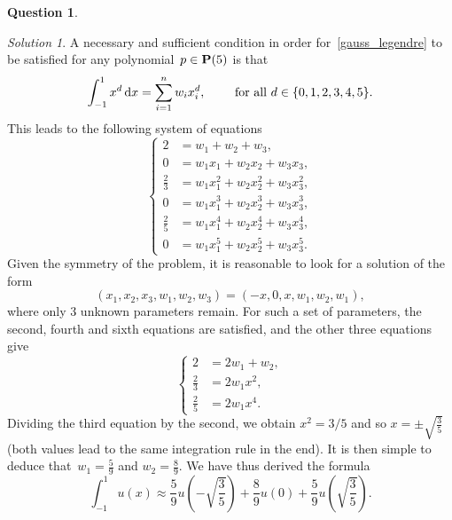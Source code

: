 \documentclass[11pt]{article}
\theoremstyle{definition}
\newtheorem{question}{Question}
\theoremstyle{remark}
\newtheorem*{solution}{Solution}
\begin{document}
\begin{question}
\begin{enumerate}
            \begin{solution}
                A necessary and sufficient condition in order for~\eqref{gauss_legendre} to be satisfied for any polynomial~$p \in \mathbf P(5)$ is that
                \[
                    \int_{-1}^{1} x^d \, \mathrm d x= \sum_{i=1}^{n} w_i x_i^d,
                    \qquad \text{ for all $d \in \{0, 1, 2, 3, 4, 5\}$}.
                \]
                This leads to the following system of equations
                \begin{equation*}
                    \left\{
                        \begin{aligned}
                            2 &= w_1 + w_2 + w_3, \\
                            0 &= w_1 x_1 + w_2 x_2 +  w_3 x_3, \\
                            \frac{2}{3} &= w_1 x_1^2 + w_2 x_2^2 +  w_3 x_3^2, \\
                            0 &= w_1 x_1^3 + w_2 x_2^3 +  w_3 x_3^3, \\
                            \frac{2}{5} &= w_1 x_1^4 + w_2 x_2^4 +  w_3 x_3^4, \\
                            0 &= w_1 x_1^5 + w_2 x_2^5 +  w_3 x_3^5.
                        \end{aligned}
                        \right.
                \end{equation*}
                Given the symmetry of the problem,
                it is reasonable to look for a solution of the form
                \[
                    (x_1, x_2, x_3, w_1, w_2, w_3)
                    = (-x, 0, x, w_1, w_2, w_1),
                \]
                where only 3 unknown parameters remain.
                For such a set of parameters,
                the second, fourth and sixth equations are satisfied,
                and the other three equations give
                \begin{equation*}
                    \left\{
                        \begin{aligned}
                            2 &= 2w_1 + w_2, \\
                            \frac{2}{3} &= 2 w_1 x^2, \\
                            \frac{2}{5} &= 2 w_1 x^4.
                        \end{aligned}
                        \right.
                \end{equation*}
                Dividing the third equation by the second,
                we obtain $x^2 = 3/5$ and so $x = \pm \sqrt{\frac{3}{5}}$ (both values lead to the same integration rule in the end).
                It is then simple to deduce that~$w_1 = \frac{5}{9}$ and $w_2 = \frac{8}{9}$.
                We have thus derived the formula
                \[
                    \int_{-1}^{1} u(x) \approx
                    \frac{5}{9} u \left( - \sqrt{\frac{3}{5}} \right)
                    + \frac{8}{9} u \left(0\right)
                    + \frac{5}{9} u \left( \sqrt{\frac{3}{5}} \right).
                \]
            \end{solution}


\end{enumerate}
\end{question}
\end{document}
